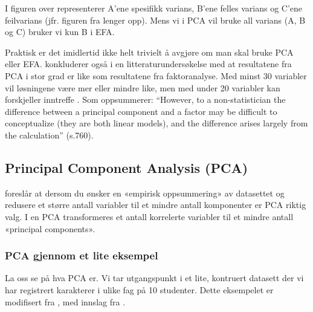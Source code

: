 \documentclass[
]{article}
\begin{document}
I figuren over representerer A'ene spesifikk varians, B'ene felles varians og C'ene feilvarians (jfr. figuren fra \citet{bjerkanFaktoranalyse2007b} lenger opp). Mens vi i PCA vil bruke all varians (A, B og C) bruker vi kun B i EFA.

Praktisk er det imidlertid ikke helt trivielt å avgjøre om man skal bruke PCA eller EFA. \citet{guadagnoliRelationSampleSize1988} konkluderer også i en litteraturundersøkelse med at resultatene fra PCA i stor grad er like som resultatene fra faktoranalyse. Med minst 30 variabler vil løsningene være mer eller mindre like, men med under 20 variabler kan forskjeller inntreffe \citep{stevensAppliedMultivariateStatistics2002}. Som \citet{fieldDiscoveringStatisticsUsing2009} oppsummerer: ``However, to a non-statistician the difference between a principal component and a factor may be difficult to conceptualize (they are both linear models), and the difference arises largely from the calculation'' (s.760).

\hypertarget{principal-component-analysis-pca}{%
\subsection{Principal Component Analysis (PCA)}\label{principal-component-analysis-pca}}

\citet{tabachnikUsingMultivariateStatistics2007} foreslår at dersom du ønsker en «empirisk oppsummering» av datasettet og redusere et større antall variabler til et mindre antall komponenter er PCA riktig valg. I en PCA transformeres et antall korrelerte variabler til et mindre antall «principal components».

\hypertarget{pca-gjennom-et-lite-eksempel}{%
\subsubsection{PCA gjennom et lite eksempel}\label{pca-gjennom-et-lite-eksempel}}

La oss se på hva PCA er. Vi tar utgangspunkt i et lite, kontruert datasett der vi har registrert karakterer i ulike fag på 10 studenter. Dette eksempelet er modifisert fra \citet{starmerStatQuestPrincipalComponent2018}, med innslag fra \citet{pittardPrincipalComponentsAnalysis2012}.

\providecommand{\docline}[3]{\noalign{\global\setlength{\arrayrulewidth}{#1}}\arrayrulecolor[HTML]{#2}\cline{#3}}

\setlength{\tabcolsep}{2pt}

\renewcommand*{\arraystretch}{1.5}
\end{document}
